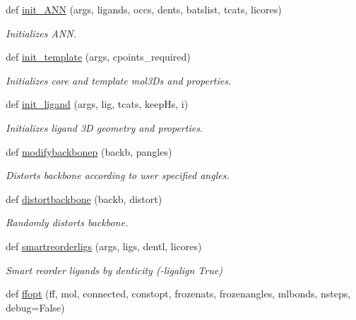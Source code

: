 \begin{DoxyCompactItemize}
def \hyperlink{namespacemolSimplify_1_1Scripts_1_1structgen_a0143758ce0284cc6b662a5ac5f39818b}{init\+\_\+\+A\+NN} (args, ligands, occs, dents, batslist, tcats, licores)
\begin{DoxyCompactList}\small\item\em Initializes A\+NN. \end{DoxyCompactList}\item 
def \hyperlink{namespacemolSimplify_1_1Scripts_1_1structgen_a2c5ec4647f80764e3e8526df7662a524}{init\+\_\+template} (args, cpoints\+\_\+required)
\begin{DoxyCompactList}\small\item\em Initializes core and template mol3\+Ds and properties. \end{DoxyCompactList}\item 
def \hyperlink{namespacemolSimplify_1_1Scripts_1_1structgen_a3687ca508aa4390f1964ead5ce0411db}{init\+\_\+ligand} (args, lig, tcats, keep\+Hs, i)
\begin{DoxyCompactList}\small\item\em Initializes ligand 3D geometry and properties. \end{DoxyCompactList}\item 
def \hyperlink{namespacemolSimplify_1_1Scripts_1_1structgen_a54f5af396e8da068c110f90043ba9621}{modifybackbonep} (backb, pangles)
\begin{DoxyCompactList}\small\item\em Distorts backbone according to user specified angles. \end{DoxyCompactList}\item 
def \hyperlink{namespacemolSimplify_1_1Scripts_1_1structgen_a4f54c3884321f27f7791785de3a348d1}{distortbackbone} (backb, distort)
\begin{DoxyCompactList}\small\item\em Randomly distorts backbone. \end{DoxyCompactList}\item 
def \hyperlink{namespacemolSimplify_1_1Scripts_1_1structgen_ace8c0eaa680157fc0242697a53a847a8}{smartreorderligs} (args, ligs, dentl, licores)
\begin{DoxyCompactList}\small\item\em Smart reorder ligands by denticity (-\/ligalign True) \end{DoxyCompactList}\item 
def \hyperlink{namespacemolSimplify_1_1Scripts_1_1structgen_a1c48077780530e1f82a2048b3e4e47e2}{ffopt} (ff, mol, connected, constopt, frozenats, frozenangles, mlbonds, nsteps, debug=False)

\end{DoxyCompactItemize}
